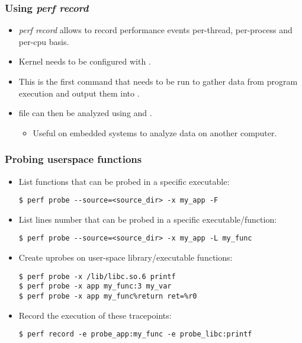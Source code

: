 \begin{frame}[fragile]
  \frametitle{Using {\em perf record}}
  \begin{itemize}
    \item {\em perf record} allows to record performance events per-thread,
          per-process and per-cpu basis.
    \item Kernel needs to be configured with .
    \item This is the first command that needs to be run to gather data from
          program execution and output them into .
    \item {} file can then be analyzed using 
          and .
    \begin{itemize}
      \item Useful on embedded systems to analyze data on another computer.
    \end{itemize}
  \end{itemize}
\end{frame}

\begin{frame}[fragile]
  \frametitle{Probing userspace functions}
  \begin{itemize}
    \item List functions that can be probed in a specific
          executable:
  \begin{block}{}
    \begin{verbatim}
$ perf probe --source=<source_dir> -x my_app -F
    \end{verbatim}
  \end{block}
    \item List lines number that can be probed in a specific
          executable/function:
  \begin{block}{}
    \begin{verbatim}
$ perf probe --source=<source_dir> -x my_app -L my_func
    \end{verbatim}
  \end{block}
    \item Create uprobes on user-space library/executable functions:
  \begin{block}{}
    \begin{verbatim}
$ perf probe -x /lib/libc.so.6 printf
$ perf probe -x app my_func:3 my_var
$ perf probe -x app my_func%return ret=%r0
    \end{verbatim}
  \end{block}
  \item Record the execution of these tracepoints:
  \begin{block}{}
    \begin{verbatim}
$ perf record -e probe_app:my_func -e probe_libc:printf
    \end{verbatim}
  \end{block}
  \end{itemize}
\end{frame}

